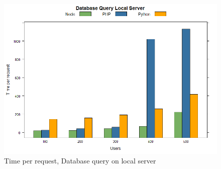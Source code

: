 \documentclass[../thesis.tex]{subfiles}
\begin{document}
	\begin{figure}[H]
		\centering
		\includegraphics[width=1\textwidth]{../images/dbLocaltpr.png}
		\caption{Time per request, Database query on local server}
		\label{rys1}
	\end{figure}
\end{document}
